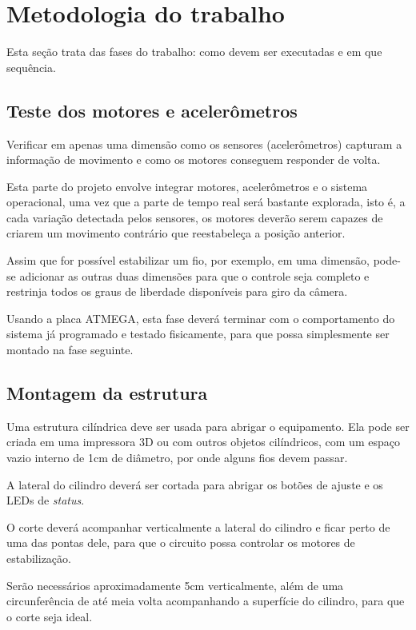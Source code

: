     \chapter{Metodologia do trabalho}
\label{CAP3}


Esta seção trata das fases do trabalho: como devem ser executadas e em que sequência.

\section{Teste dos motores e acelerômetros}
Verificar em apenas uma dimensão como os sensores (acelerômetros) capturam a informação de movimento e como os motores conseguem responder de volta.

Esta parte do projeto envolve integrar motores, acelerômetros e o sistema operacional, uma vez que a parte de tempo real será bastante explorada, isto é, a cada variação detectada pelos sensores, os motores deverão serem capazes de criarem um movimento contrário que reestabeleça a posição anterior.

Assim que for possível estabilizar um fio, por exemplo, em uma dimensão, pode-se adicionar as outras duas dimensões para que o controle seja completo e restrinja todos os graus de liberdade disponíveis para giro da câmera.

Usando a placa ATMEGA, esta fase deverá terminar com o comportamento do sistema já programado e testado fisicamente, para que possa simplesmente ser montado na fase seguinte.

\section{Montagem da estrutura}
Uma estrutura cilíndrica deve ser usada para abrigar o equipamento. Ela pode ser criada em uma impressora 3D ou com outros objetos cilíndricos, com um espaço vazio interno de 1cm de diâmetro, por onde alguns fios devem passar.

A lateral do cilindro deverá ser cortada para abrigar os botões de ajuste e os LEDs de \textit{status}.

O corte deverá acompanhar verticalmente a lateral do cilindro e ficar perto de uma das pontas dele, para que o circuito possa controlar os motores de estabilização.

Serão necessários aproximadamente 5cm verticalmente, além de uma circunferência de até meia volta acompanhando a superfície do cilindro, para que o corte seja ideal.

